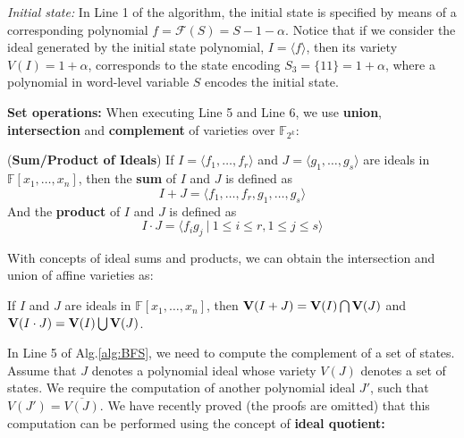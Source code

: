 {\it Initial state:} In Line 1 of the algorithm, the initial state is
specified by means of a corresponding polynomial $f = \mathcal{F}(S) =
S - 1 - \alpha$. Notice that if we consider the ideal generated by the
initial state polynomial, $I = \langle f\rangle$, then its variety
$V(I) = 1+\alpha$, corresponds to the state encoding $S_3 = \{11\} =
1+\alpha$, where a polynomial in word-level variable $S$ encodes the
initial state. 



{\bf Set operations:} When executing Line 5 and Line 6, we use
\textbf{union}, \textbf{intersection} and \textbf{complement} of
varieties over $\mathbb{F}_{2^k}$: 

\begin{definition}
\label{def:sum}
({\bf Sum/Product of Ideals}) If $I = \langle f_1, \dots, f_r\rangle$ and $J = \langle g_1, \dots, g_s\rangle$ are 
ideals in $\mathbb F[x_1, \dots, x_n]$, then the {\bf sum} of $I$ and $J$ is defined as
$$I + J = \langle f_1, \dots, f_r, g_1, \dots, g_s\rangle$$ And the {\bf product} of $I$ and $J$ is defined
as
\begin{equation}
  I \cdot J = \langle f_ig_j\ |\ 1 \leq i \leq r, 1 \leq j \leq s\rangle \nonumber
  \end{equation}
\end{definition}

With concepts of ideal sums and products, we can obtain the
intersection and union of affine varieties as:
\begin{theorem}
\label{thm:unionintersect}
If $I$ and $J$ are ideals in $\mathbb F[x_1, \dots, x_n]$, then ${\bf
  V}(I + J) = {\bf V}(I) \bigcap {\bf V}(J)$ and ${\bf V}(I \cdot J) =
{\bf V}(I) \bigcup {\bf V}(J)$. 
\end{theorem}


In Line 5 of Alg.\ref{alg:BFS}, we need to compute the complement of a
set of states. Assume that $J$ denotes a polynomial ideal whose
variety $V(J)$ denotes a set of states. We require the computation of
another polynomial ideal $J'$, such that $V(J') =
\overline{V(J)}$. We have recently proved (the proofs are omitted)
that this computation can be performed using the concept of {\bf ideal
  quotient:} 

